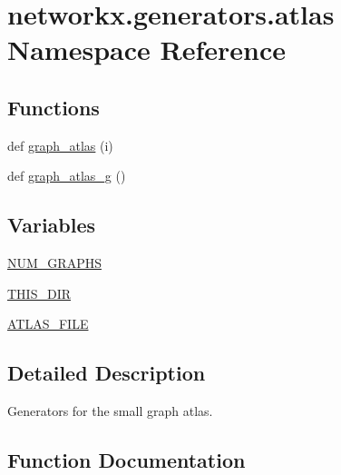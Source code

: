 \hypertarget{namespacenetworkx_1_1generators_1_1atlas}{}\section{networkx.\+generators.\+atlas Namespace Reference}
\label{namespacenetworkx_1_1generators_1_1atlas}
\subsection*{Functions}
\begin{DoxyCompactItemize}
\item 
def \hyperlink{namespacenetworkx_1_1generators_1_1atlas_a0f5c0457302a728c831a344aea0266ef}{graph\+\_\+atlas} (i)
\item 
def \hyperlink{namespacenetworkx_1_1generators_1_1atlas_a6a2c863330707267be7bd0e301e25832}{graph\+\_\+atlas\+\_\+g} ()
\end{DoxyCompactItemize}
\subsection*{Variables}
\begin{DoxyCompactItemize}
\item 
\hyperlink{namespacenetworkx_1_1generators_1_1atlas_a6517542649befec7745a8b801b49fc7f}{N\+U\+M\+\_\+\+G\+R\+A\+P\+HS}
\item 
\hyperlink{namespacenetworkx_1_1generators_1_1atlas_ae901da9f2cf876cf4106dfc256cf1d9a}{T\+H\+I\+S\+\_\+\+D\+IR}
\item 
\hyperlink{namespacenetworkx_1_1generators_1_1atlas_abd103c982d8d5c367b08a9a331724590}{A\+T\+L\+A\+S\+\_\+\+F\+I\+LE}
\end{DoxyCompactItemize}


\subsection{Detailed Description}
\begin{DoxyVerb}Generators for the small graph atlas.
\end{DoxyVerb}
 

\subsection{Function Documentation}
\mbox{\label{namespacenetworkx_1_1generators_1_1atlas_a0f5c0457302a728c831a344aea0266ef}} 
